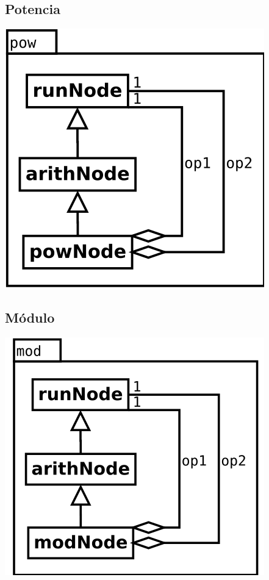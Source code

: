 \subsection {Potencia}
\begin{center}
\includegraphics[scale=0.4]{pow.png} \\
\end{center}

\subsection {Módulo}
\begin{center}
\includegraphics[scale=0.4]{mod.png} \\
\end{center}


